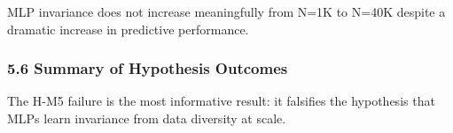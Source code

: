 MLP invariance does not increase meaningfully from N=1K to N=40K despite a dramatic increase in predictive performance.

\subsubsection{5.6 Summary of Hypothesis Outcomes}

\begin{table}[htbp]
\centering
{}
\end{table}

The H-M5 failure is the most informative result: it falsifies the hypothesis that MLPs learn invariance from data diversity at scale.


